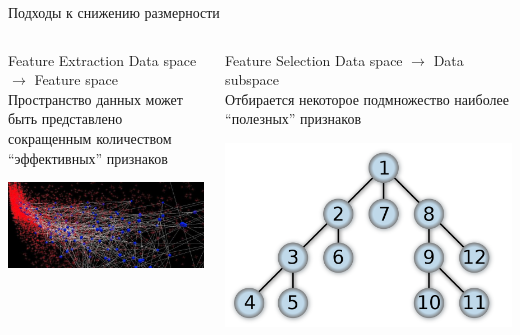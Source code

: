\documentclass[10pt]{beamer}
\begin{document}
\begin{frame}{Подходы к снижению размерности}

\begin{columns}[C]
        \centering
        \begin{column}{.5\textwidth} 
                \begin{block}{Feature Extraction}
                Data space $\rightarrow$ Feature space\\
                Пространство данных может быть представлено
                сокращенным количеством ``эффективных'' признаков
                \begin{center}
                    \includegraphics[scale=0.2]{images/gng.jpg}
                \end{center}
                \end{block}
        \end{column}%
        \begin{column}{.5\textwidth}
                \begin{block}{Feature Selection}
                Data space $\rightarrow$ Data subspace\\
                Отбирается некоторое подмножество наиболее
                ``полезных'' признаков
                \begin{center}
                    \includegraphics[scale=0.06]{images/dfs.png}
                \end{center}
                \end{block}
        \end{column}
\end{columns}

\end{frame}
\end{document}

